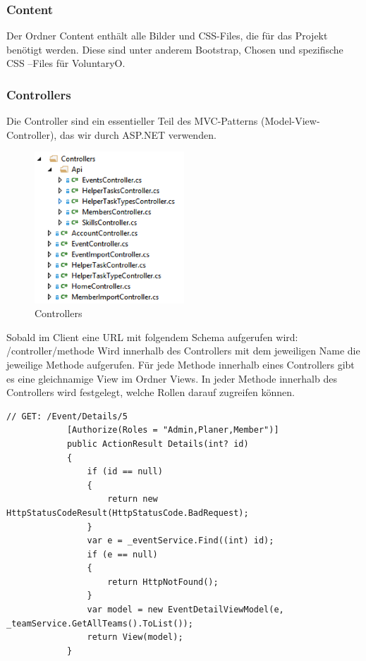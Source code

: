 		\subsubsection{Content}
			Der Ordner Content enthält alle Bilder und CSS-Files, die für das Projekt benötigt werden. Diese sind unter anderem Bootstrap, Chosen und spezifische CSS –Files für VoluntaryO.

		\subsubsection{Controllers}
			Die Controller sind ein essentieller Teil des MVC-Patterns (Model-View-Controller), das wir durch ASP.NET verwenden.





			\begin{figure}[H]
		    	\centering
		    	 \includegraphics[width=0.5\textwidth]{content/architekturdokumentation/images/web-2-Controllers.png}
		  		\vspace{-5pt}
				\caption{Controllers}
			\end{figure}

			Sobald im Client eine URL mit folgendem Schema aufgerufen wird:
			/{controller}/{methode}
			Wird innerhalb des Controllers mit dem jeweiligen Name die jeweilige Methode aufgerufen. Für jede Methode innerhalb eines Controllers gibt es eine gleichnamige View im Ordner Views.
			In jeder Methode innerhalb des Controllers wird festgelegt, welche Rollen darauf zugreifen können.

			\begin{lstlisting}[language=CSharp, caption=EventController.cs, label=lst:Details firstnumber=1]
			// GET: /Event/Details/5
	        [Authorize(Roles = "Admin,Planer,Member")]
	        public ActionResult Details(int? id)
	        {
	            if (id == null)
	            {
	                return new HttpStatusCodeResult(HttpStatusCode.BadRequest);
	            }
	            var e = _eventService.Find((int) id);
	            if (e == null)
	            {
	                return HttpNotFound();
	            }
	            var model = new EventDetailViewModel(e, _teamService.GetAllTeams().ToList());
	            return View(model);
	        }
			\end{lstlisting}

